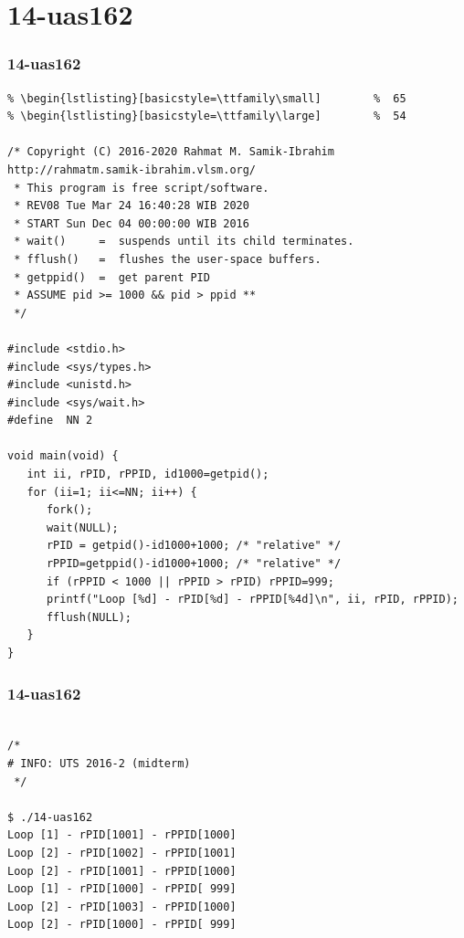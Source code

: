 \documentclass[aspectratio=169, xcolor=table, notheorems, hyperref={pdfpagelabels=false}]{beamer}
\begin{document}
\section{14-uas162}
\begin{frame}[fragile]
\frametitle{14-uas162}
\begin{lstlisting}[basicstyle=\ttfamily\tiny]         % 108
% \begin{lstlisting}[basicstyle=\ttfamily\footnotesize] %  72
% \begin{lstlisting}[basicstyle=\ttfamily\small]        %  65
% \begin{lstlisting}[basicstyle=\ttfamily\large]        %  54

/* Copyright (C) 2016-2020 Rahmat M. Samik-Ibrahim http://rahmatm.samik-ibrahim.vlsm.org/
 * This program is free script/software.
 * REV08 Tue Mar 24 16:40:28 WIB 2020
 * START Sun Dec 04 00:00:00 WIB 2016
 * wait()     =  suspends until its child terminates. 
 * fflush()   =  flushes the user-space buffers.
 * getppid()  =  get parent PID
 * ASSUME pid >= 1000 && pid > ppid **
 */

#include <stdio.h>
#include <sys/types.h>
#include <unistd.h>
#include <sys/wait.h>
#define  NN 2

void main(void) {
   int ii, rPID, rPPID, id1000=getpid();
   for (ii=1; ii<=NN; ii++) {
      fork();
      wait(NULL);
      rPID = getpid()-id1000+1000; /* "relative" */
      rPPID=getppid()-id1000+1000; /* "relative" */
      if (rPPID < 1000 || rPPID > rPID) rPPID=999;
      printf("Loop [%d] - rPID[%d] - rPPID[%4d]\n", ii, rPID, rPPID);
      fflush(NULL);
   }
}

\end{lstlisting}
\end{frame}

\begin{frame}[fragile]
\frametitle{14-uas162}
\begin{lstlisting}[basicstyle=\ttfamily\large]        %  54

/*
# INFO: UTS 2016-2 (midterm)
 */

$ ./14-uas162 
Loop [1] - rPID[1001] - rPPID[1000]
Loop [2] - rPID[1002] - rPPID[1001]
Loop [2] - rPID[1001] - rPPID[1000]
Loop [1] - rPID[1000] - rPPID[ 999]
Loop [2] - rPID[1003] - rPPID[1000]
Loop [2] - rPID[1000] - rPPID[ 999]

\end{lstlisting}
\end{frame}
\end{document}
